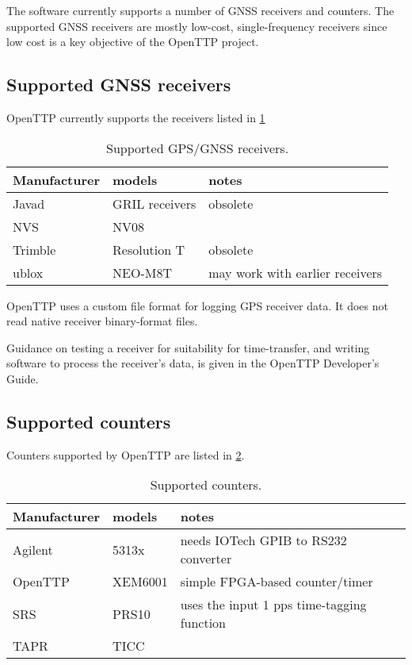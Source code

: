 The software currently supports a number of GNSS receivers and counters. 
The supported GNSS receivers are mostly low-cost, single-frequency receivers since low cost is a key objective of 
the OpenTTP project.
	
	\subsection{Supported GNSS receivers}
	
	OpenTTP currently supports the receivers listed in \ref{t:receivers}
	
	\begin{table}[h]
	\begin{tabular}{lll}
	Manufacturer & models & notes \\ \hline
	Javad & GRIL receivers & obsolete \\
	NVS   & NV08 & \\
	Trimble & Resolution T & obsolete\\
	ublox & NEO-M8T & may work with earlier receivers\\
	\end{tabular}
	\caption{Supported GPS/GNSS receivers.\label{t:receivers}}
	\end{table}
	
	OpenTTP uses a custom file format for logging GPS receiver data. 
	It does not read native receiver binary-format files.
	
	Guidance on testing a receiver for suitability for time-transfer, and writing software to process
	the receiver's data, is given in the OpenTTP Developer's Guide.
	
	\subsection{Supported counters}
	
	Counters supported by OpenTTP are listed in \ref{t:counters}.
	
	\begin{table}[h]
	\begin{tabular}{lll}
	Manufacturer & models & notes \\ \hline
	Agilent & 5313x &  needs IOTech GPIB to RS232 converter\\
	OpenTTP & XEM6001 & simple FPGA-based counter/timer \\
	SRS & PRS10 & uses the input 1 pps time-tagging function\\
	TAPR & TICC &\\
	\end{tabular}
	\caption{Supported counters. \label{t:counters}}
	\end{table}
	
